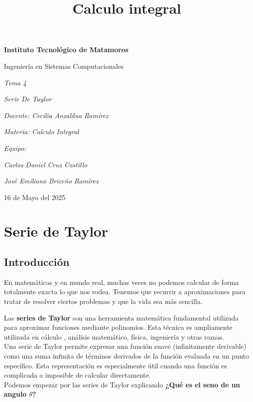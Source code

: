 \documentclass[12pt, a4paper, oneside]{article}
\title{Calculo integral}
\begin{document}
\begin{titlepage}
	\centering
	{\bfseries\LARGE Instituto Tecnológico de Matamoros \par}
	\vspace{1cm}
	{\Large Ingeniería en Sistemas Computacionales \par}
	\vspace{3cm}
	{\Huge \it Tema 4  \par}
	{\Huge \it Serie De Taylor \par}
	\vspace{3cm}
	{\itshape\large Docente: Cecilia Anzaldua Ramírez \par}
	{\itshape\large Materia: Calculo Integral \par}
	\vfill
	{\itshape\large Equipo: \par}
	{\itshape\large Carlos Daniel Cruz Castillo \par}
	{\itshape\large José Emiliano Briceño Ramírez}
	\vfill
	{\large 16 de Mayo del 2025 \par}

\end{titlepage}

\section{Serie de Taylor}
\subsection{Introducción}
En matemáticas y en mundo real, muchas veces no podemos calcular de
forma totalmente exacta lo que nos rodea. Tenemos que recurrir a
aproximaciones para tratar de resolver ciertos problemas y que la
vida sea más sencilla.
\par

Las \textbf{series de Taylor} son una herramienta matemática fundamental
utilizada para aproximar funciones mediante polinomios. Esta técnica es
ampliamente utilizada en cálculo , análisis matemático, física,
ingeniería y otras ramas.\\

Una serie de Taylor permite expresar una función suave (infinitamente
derivable) como una suma infinita de términos derivados de la función
evaluada en un punto específico. Esta representación es especialmente
útil cuando una función es complicada o imposible de calcular
directamente.\\

Podemos empezar por las series de Taylor explicando \textbf{¿Qué es
	el seno de un angulo $\theta$?}
\end{document}
